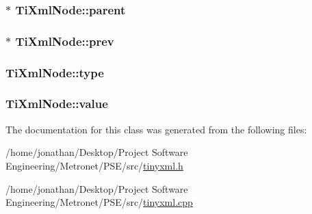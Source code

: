 \subsubsection[{\texorpdfstring{parent}{parent}}]{$\ast$ Ti\+Xml\+Node\+::parent\hspace{0.3cm}{\ttfamily [protected]}}\hypertarget{class_ti_xml_node_a662c4de61244e4fa5bd4e2d8c63143a5}{}\label{class_ti_xml_node_a662c4de61244e4fa5bd4e2d8c63143a5}
\subsubsection[{\texorpdfstring{prev}{prev}}]{$\ast$ Ti\+Xml\+Node\+::prev\hspace{0.3cm}{\ttfamily [protected]}}\hypertarget{class_ti_xml_node_a9c5370ea2cbfd9f0e0f7b30a57fd68f5}{}\label{class_ti_xml_node_a9c5370ea2cbfd9f0e0f7b30a57fd68f5}
\subsubsection[{\texorpdfstring{type}{type}}]{ Ti\+Xml\+Node\+::type\hspace{0.3cm}{\ttfamily [protected]}}\hypertarget{class_ti_xml_node_a2619c6379181c16ba95ae6922e2ca839}{}\label{class_ti_xml_node_a2619c6379181c16ba95ae6922e2ca839}
\subsubsection[{\texorpdfstring{value}{value}}]{ Ti\+Xml\+Node\+::value\hspace{0.3cm}{\ttfamily [protected]}}\hypertarget{class_ti_xml_node_aead528b3cedc33c16a6c539872c7cc8b}{}\label{class_ti_xml_node_aead528b3cedc33c16a6c539872c7cc8b}


The documentation for this class was generated from the following files\+:\begin{DoxyCompactItemize}
\item 
/home/jonathan/\+Desktop/\+Project Software Engineering/\+Metronet/\+P\+S\+E/src/\hyperlink{tinyxml_8h}{tinyxml.\+h}\item 
/home/jonathan/\+Desktop/\+Project Software Engineering/\+Metronet/\+P\+S\+E/src/\hyperlink{tinyxml_8cpp}{tinyxml.\+cpp}\end{DoxyCompactItemize}
